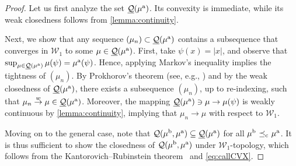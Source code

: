\documentclass[11pt]{article}
\newcommand{\cQ}{\mathcal{Q}}
\newcommand{\cW}{\mathcal{W}}
\theoremstyle{plain}
\theoremstyle{definition}
\theoremstyle{remark}
\DeclareMathOperator{\cleq}{\,\preceq_{\rm c}\,}
\theoremstyle{plain}
\begin{document}
%

%

\begin{proof}
%
Let us first analyze the set $\underline{\cQ}(\mu^{\rm a})$. Its convexity is immediate, while its weak closedness follows from \cref{lemma:continuity}.
%
%
    
Next, we show that any sequence $(\mu_n) \subset  \underline{\cQ}(\mu^{\rm a})$ contains 
a subsequence 
that converges in $\cW_1$ to some $\mu \in \underline{\cQ}(\mu^{\rm a})$. First, take $\psi(x) = |x|$, and  observe that $\sup_{\mu \in \underline{\cQ}(\mu^{\rm a})} \mu(\psi) = \mu^{\rm a}(\psi)$. 
%
%
%
Hence, applying Markov's inequality implies the tightness of $(\mu_n)$. By Prokhorov's theorem (see, e.g., \cite[Theorem~8.6.2]{Bogachev2007}) and by the weak closedness of $\underline{\cQ}(\mu^{\rm a})$, there exists a subsequence $(\mu_n)$, up to re-indexing, such that $\mu_n \overset{w}{\to} \mu \in \underline{\cQ}(\mu^{\rm a})$. Moreover,  the mapping $\underline{\cQ}(\mu^{\rm a}) \ni \mu  \to \mu(\psi) $ is weakly continuous by \cref{lemma:continuity}, implying that $\mu_n \to \mu$ with respect to  $\cW_1$.

Moving on to  the general case,  note that  $\cQ(\mu^{\rm b},\mu^{\rm a}) \subseteq \underline{\cQ}(\mu^{\rm a})$ for all $\mu^{\rm b} \cleq \mu^{\rm a}$. %
It is thus sufficient to show  the closedness of   $\cQ(\mu^{\rm b},\mu^{\rm a})$ under $\cW_1$-topology, which follows from the Kantorovich--Rubinstein theorem~\citep[Theorem~1.14]{villani2009optimal} and \eqref{eq:callCVX}.%
\end{proof}    



%
%
%
%
%
%
%
%
%
%
%
%
%
%
%
%
%
%
%
%
%
%
%
%
%
%
%
%
%

%
\end{document}
